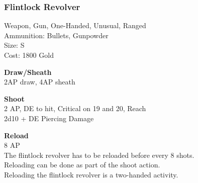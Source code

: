 \subsubsection{Flintlock Revolver}\label{weapon:flintlockRevolver}
Weapon, Gun, One-Handed, Unusual, Ranged\\
Ammunition: Bullets, Gunpowder\\
Size: S\\
Cost: 1800 Gold

\textbf{Draw/Sheath} \\
2AP draw, 4AP sheath

\textbf{Shoot} \\
2 AP, DE to hit, Critical on 19 and 20,  Reach\\
2d10 + DE Piercing Damage

\textbf{Reload} \\
8 AP\\
The flintlock revolver has to be reloaded before every 8 shots.\\
Reloading can be done as part of the shoot action.\\
Reloading the flintlock revolver is a two-handed activity.
